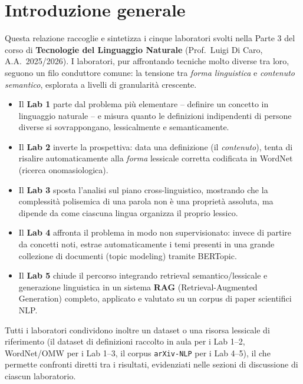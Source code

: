 \documentclass[12pt,a4paper]{article}
\begin{document}
\tableofcontents
\newpage

\section{Introduzione generale}

Questa relazione raccoglie e sintetizza i cinque laboratori svolti nella Parte 3 del corso di \textbf{Tecnologie del Linguaggio Naturale} (Prof.\ Luigi Di Caro, A.A.\ 2025/2026). I laboratori, pur affrontando tecniche molto diverse tra loro, seguono un filo conduttore comune: la tensione tra \emph{forma linguistica} e \emph{contenuto semantico}, esplorata a livelli di granularit\`a crescente.

\begin{itemize}
  \item Il \textbf{Lab 1} parte dal problema pi\`u elementare -- definire un concetto in linguaggio naturale -- e misura quanto le definizioni indipendenti di persone diverse si sovrappongano, lessicalmente e semanticamente.
  \item Il \textbf{Lab 2} inverte la prospettiva: data una definizione (il \emph{contenuto}), tenta di risalire automaticamente alla \emph{forma} lessicale corretta codificata in WordNet (ricerca onomasiologica).
  \item Il \textbf{Lab 3} sposta l'analisi sul piano cross-linguistico, mostrando che la complessit\`a polisemica di una parola non \`e una propriet\`a assoluta, ma dipende da come ciascuna lingua organizza il proprio lessico.
  \item Il \textbf{Lab 4} affronta il problema in modo non supervisionato: invece di partire da concetti noti, estrae automaticamente i temi presenti in una grande collezione di documenti (topic modeling) tramite BERTopic.
  \item Il \textbf{Lab 5} chiude il percorso integrando retrieval semantico/lessicale e generazione linguistica in un sistema \textbf{RAG} (Retrieval-Augmented Generation) completo, applicato e valutato su un corpus di paper scientifici NLP.
\end{itemize}

Tutti i laboratori condividono inoltre un dataset o una risorsa lessicale di riferimento (il dataset di definizioni raccolto in aula per i Lab 1--2, WordNet/OMW per i Lab 1--3, il corpus \texttt{arXiv-NLP} per i Lab 4--5), il che permette confronti diretti tra i risultati, evidenziati nelle sezioni di discussione di ciascun laboratorio.
\end{document}
